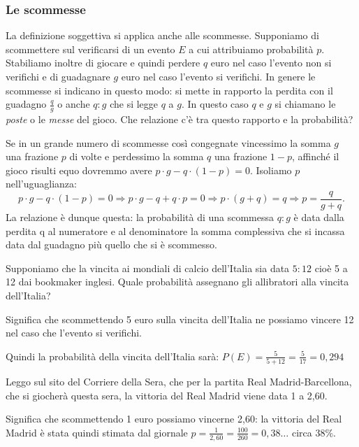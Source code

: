\subsubsection*{Le scommesse}
La definizione soggettiva si applica anche alle scommesse. Supponiamo di scommettere sul verificarsi di un evento $E$ a cui attribuiamo probabilità $p$. Stabiliamo inoltre di giocare e quindi perdere $q$ euro nel caso l'evento non si verifichi e di guadagnare $g$ euro nel caso l'evento si verifichi. In genere le scommesse si indicano in questo modo: si mette in rapporto la perdita con il guadagno $\frac q g$ o anche $q:g$ che si legge $q$ a $g$. In questo caso $q$ e $g$ si chiamano le \emph{poste} o le \emph{messe} del gioco.
Che relazione c'è tra questo rapporto e la probabilità?

Se in un grande numero di scommesse così congegnate vincessimo la somma $g$ una frazione $p$ di volte e perdessimo la somma $q$ una frazione $1-p$, affinché il gioco risulti equo dovremmo avere $p\cdot g-q\cdot (1-p)=0$. Isoliamo $p$ nell'uguaglianza:
\begin{equation*}
p\cdot g-q\cdot (1-p)=0 \Rightarrow p\cdot g-q+q\cdot p=0\Rightarrow p\cdot (g+q)=q \Rightarrow p=\frac q{g+q}.
\end{equation*}
La relazione è dunque questa: la probabilità di una scommessa $q:g$ è data dalla perdita q al numeratore e al denominatore la somma complessiva che si incassa data dal guadagno più quello che si è scommesso.


\begin{exrig}
\begin{esempio}
Supponiamo che la vincita ai mondiali di calcio dell'Italia sia data $5:12$ cioè 5 a 12 dai bookmaker inglesi. Quale probabilità assegnano gli allibratori alla vincita dell'Italia?

Significa che scommettendo 5 euro sulla vincita dell'Italia ne possiamo vincere 12 nel caso che l'evento si verifichi.

Quindi la probabilità della vincita dell'Italia sarà:
$P(E)=\frac 5{5+12}=\frac 5{17}=0,294$
\end{esempio}

\begin{esempio}
Leggo sul sito del Corriere della Sera, che per la partita Real Madrid-Barcellona, che si giocherà questa sera, la vittoria del Real Madrid viene data 1 a 2,60.

Significa che scommettendo 1 euro possiamo vincerne 2,60: la vittoria del Real Madrid è stata quindi stimata dal giornale $p=\frac 1{2,60}=\frac{100}{260}=0,38\ldots$ circa 38\%.
\end{esempio}
\end{exrig}
\ovalbox{\risolvii \ref{ese:9.6}, \ref{ese:9.7}, \ref{ese:9.8}, \ref{ese:9.9}, \ref{ese:9.10}, \ref{ese:9.11}, \ref{ese:9.12}, \ref{ese:9.13}, \ref{ese:9.14}, \ref{ese:9.15}, \ref{ese:9.16}, \ref{ese:9.17}, \ref{ese:9.18},}

